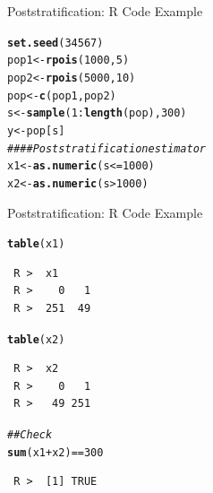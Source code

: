 \documentclass[10pt]{beamer}\usepackage[]{graphicx}\usepackage[]{xcolor}
\makeatletter
\newcommand{\hlnum}[1]{\textcolor[rgb]{0.686,0.059,0.569}{#1}}%
\newcommand{\hlcom}[1]{\textcolor[rgb]{0.678,0.584,0.686}{\textit{#1}}}%
\newcommand{\hlopt}[1]{\textcolor[rgb]{0,0,0}{#1}}%
\newcommand{\hlstd}[1]{\textcolor[rgb]{0.345,0.345,0.345}{#1}}%
\newcommand{\hlkwb}[1]{\textcolor[rgb]{0.69,0.353,0.396}{#1}}%
\newcommand{\hlkwd}[1]{\textcolor[rgb]{0.737,0.353,0.396}{\textbf{#1}}}%
\newenvironment{kframe}{%
 \def\at@end@of@kframe{}%
 \ifinner\ifhmode%
  \def\at@end@of@kframe{\end{minipage}}%
  \begin{minipage}{\columnwidth}%
 \fi\fi%
 \def\FrameCommand##1{\hskip\@totalleftmargin \hskip-\fboxsep
 \colorbox{shadecolor}{##1}\hskip-\fboxsep
     \hskip-\linewidth \hskip-\@totalleftmargin \hskip\columnwidth}%
 \MakeFramed {\advance\hsize-\width
   \@totalleftmargin\z@ \linewidth\hsize
   \@setminipage}}%
 {\par\unskip\endMakeFramed%
 \at@end@of@kframe}
\newenvironment{knitrout}{}{} %
\makeatother
\begin{document}
\begin{frame}[containsverbatim]{Poststratification: R Code Example}
\small
\begin{knitrout}
\color{fgcolor}\begin{kframe}
\begin{alltt}
\hlkwd{set.seed}\hlstd{(}\hlnum{34567}\hlstd{)}
\hlstd{pop1} \hlkwb{<-} \hlkwd{rpois}\hlstd{(}\hlnum{1000}\hlstd{,} \hlnum{5}\hlstd{)}
\hlstd{pop2} \hlkwb{<-} \hlkwd{rpois}\hlstd{(}\hlnum{5000}\hlstd{,} \hlnum{10}\hlstd{)}
\hlstd{pop} \hlkwb{<-} \hlkwd{c}\hlstd{(pop1, pop2)}
\hlstd{s} \hlkwb{<-} \hlkwd{sample}\hlstd{(}\hlnum{1}\hlopt{:}\hlkwd{length}\hlstd{(pop),} \hlnum{300}\hlstd{)}
\hlstd{y} \hlkwb{<-} \hlstd{pop[s]}
\hlcom{#### Post stratification estimator}
\hlstd{x1} \hlkwb{<-} \hlkwd{as.numeric}\hlstd{(s} \hlopt{<=} \hlnum{1000}\hlstd{)}
\hlstd{x2} \hlkwb{<-} \hlkwd{as.numeric}\hlstd{(s} \hlopt{>} \hlnum{1000}\hlstd{)}
\end{alltt}
\end{kframe}
\end{knitrout}
\end{frame}

\begin{frame}[containsverbatim]{Poststratification: R Code Example}
\small
\begin{knitrout}
\color{fgcolor}\begin{kframe}
\begin{alltt}
\hlkwd{table}\hlstd{(x1)}
\end{alltt}
\begin{verbatim}
 R >  x1
 R >    0   1 
 R >  251  49
\end{verbatim}
\begin{alltt}
\hlkwd{table}\hlstd{(x2)}
\end{alltt}
\begin{verbatim}
 R >  x2
 R >    0   1 
 R >   49 251
\end{verbatim}
\begin{alltt}
\hlcom{## Check}
\hlkwd{sum}\hlstd{(x1} \hlopt{+} \hlstd{x2)} \hlopt{==} \hlnum{300}
\end{alltt}
\begin{verbatim}
 R >  [1] TRUE
\end{verbatim}
\end{kframe}
\end{knitrout}
\end{frame}
\end{document}
